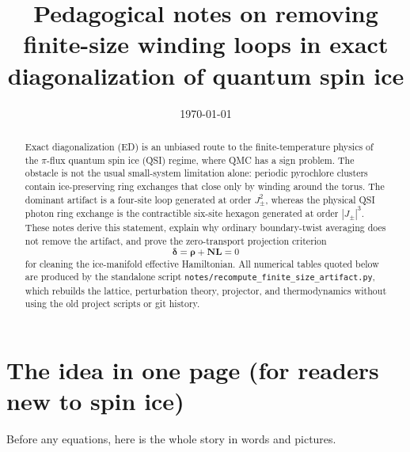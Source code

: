 \documentclass[11pt,letterpaper]{article}
\title{Pedagogical notes on removing finite-size winding loops in exact
diagonalization of quantum spin ice}
\author{}
\date{\today}
\newcommand{\Jpm}{J_{\pm}}
\newcommand{\bN}{\bm N}
\newcommand{\bL}{\bm L}
\newcommand{\brho}{\bm \rho}
\newcommand{\bdelta}{\bm \delta}
\theoremstyle{plain}
\theoremstyle{definition}
\begin{document}
\maketitle

\begin{abstract}
Exact diagonalization (ED) is an unbiased route to the finite-temperature
physics of the $\pi$-flux quantum spin ice (QSI) regime, where QMC has a
sign problem.  The obstacle is not the usual small-system limitation alone:
periodic pyrochlore clusters contain ice-preserving ring exchanges that
close only by winding around the torus.  The dominant artifact is a
four-site loop generated at order $\Jpm^2$, whereas the physical QSI photon
ring exchange is the contractible six-site hexagon generated at order
$|\Jpm|^3$.  These notes derive this statement, explain why ordinary
boundary-twist averaging does not remove the artifact, and prove the
zero-transport projection criterion
\[
        \bdelta=\brho+\bN\bL=0
\]
for cleaning the ice-manifold effective Hamiltonian.  All numerical tables
quoted below are produced by the standalone script
\texttt{notes/recompute\_finite\_size\_artifact.py}, which rebuilds the
lattice, perturbation theory, projector, and thermodynamics without using
the old project scripts or git history.
\end{abstract}

\tableofcontents

\section{The idea in one page (for readers new to spin ice)}

Before any equations, here is the whole story in words and pictures.
\end{document}
